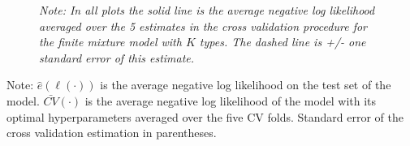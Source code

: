\documentclass[11pt,a4paper]{article}
\theoremstyle{definition}
\begin{document}
\begin{figure}[!ht]
\footnotesize
  \textit{Note: In all plots the solid line is the average negative log likelihood averaged over the 5 estimates in the cross validation procedure for the finite mixture model with $K$ types. The dashed line is +/- one standard error of this estimate.}
\end{figure}

\begin{table}[!ht]
\caption{ML benchmarks on the heterogeneous level}
\label{tab:ML-het}
\centering
\begin{threeparttable}
\renewcommand{\TPTminimum}{\linewidth}
\begin{footnotesize}
\end{footnotesize}
\begin{tablenotes}
      \footnotesize
      \item Note: $\hat{e}(\ell(\cdot))$ is the average negative log likelihood on the test set of the model. $\bar{CV}(\cdot)$ is the average negative log likelihood of the model with its optimal hyperparameters averaged over the five CV folds.  Standard error of the cross validation estimation in parentheses.
    \end{tablenotes}
\end{threeparttable}
\end{table}
\end{document}
